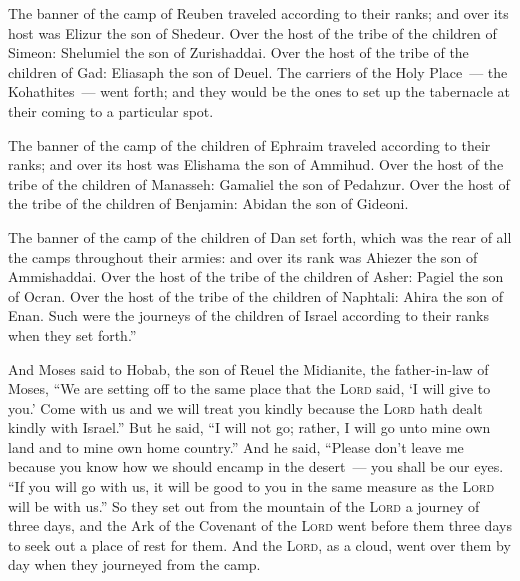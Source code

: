 \begin{inparaenum}
     The banner of the camp of Reuben traveled according to their ranks; and over its host was Elizur the son of Shedeur.%
     Over the host of the tribe of the children of Simeon: Shelumiel the son of Zurishaddai.%
     Over the host of the tribe of the children of Gad: Eliasaph the son of Deuel.%
     The carriers of the Holy Place~--- the Kohathites~--- went forth; and they would be the ones to set up the tabernacle at their coming to a particular spot.%
    
     The banner of the camp of the children of Ephraim traveled according to their ranks; and over its host was Elishama the son of Ammihud.%
     Over the host of the tribe of the children of Manasseh: Gamaliel the son of Pedahzur.%
     Over the host of the tribe of the children of Benjamin: Abidan the son of Gideoni.%
    
     The banner of the camp of the children of Dan set forth, which was the rear of all the camps throughout their armies: and over its rank was Ahiezer the son of Ammishaddai.%
     Over the host of the tribe of the children of Asher: Pagiel the son of Ocran.%
     Over the host of the tribe of the children of Naphtali: Ahira the son of Enan.%
     Such were the journeys of the children of Israel according to their ranks when they set forth.''%
    
     And Moses said to Hobab, the son of Reuel the Midianite, the father-in-law of Moses, ``We are setting off to the same place that the \textsc{Lord} said, `I will give to you.' Come with us and we will treat you kindly because the \textsc{Lord} hath dealt kindly with Israel.''%
     But he said, ``I will not go; rather, I will go unto mine own land and to mine own home country.''%
     And he said, ``Please don't leave me because you know how we should encamp in the desert~--- you shall be our eyes.%
     ``If you will go with us, it will be good to you in the same measure as the \textsc{Lord} will be with us.''%
     So they set out from the mountain of the \textsc{Lord} a journey of three days, and the Ark of the Covenant of the \textsc{Lord} went before them three days to seek out a place of rest for them.%
     And the \textsc{Lord}, as a cloud, went over them by day when they journeyed from the camp.%
    

\end{inparaenum}
